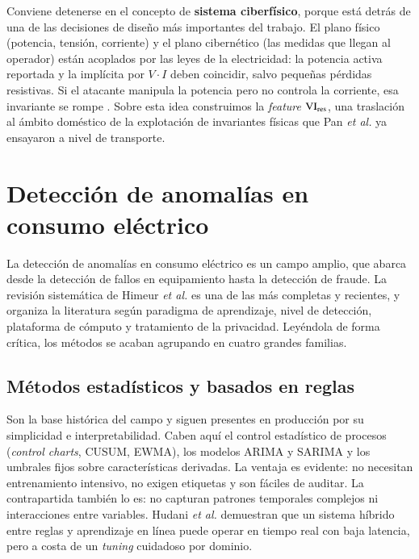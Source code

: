 Conviene detenerse en el concepto de \textbf{sistema ciberfísico}, porque está detrás de una de las decisiones de diseño más importantes del trabajo. El plano físico (potencia, tensión, corriente) y el plano cibernético (las medidas que llegan al operador) están acoplados por las leyes de la electricidad: la potencia activa reportada y la implícita por $V\cdot I$ deben coincidir, salvo pequeñas pérdidas resistivas. Si el atacante manipula la potencia pero no controla la corriente, esa invariante se rompe \cite{ahmad2025aif}. Sobre esta idea construimos la \textit{feature} $\mathrm{VI}_{\text{res}}$, una traslación al ámbito doméstico de la explotación de invariantes físicas que Pan \emph{et al.} \cite{pan2015fdi} ya ensayaron a nivel de transporte.

\section{Detección de anomalías en consumo eléctrico}
\label{sec:soa-ad}

La detección de anomalías en consumo eléctrico es un campo amplio, que abarca desde la detección de fallos en equipamiento hasta la detección de fraude. La revisión sistemática de Himeur \emph{et al.} \cite{himeur2021review} es una de las más completas y recientes, y organiza la literatura según paradigma de aprendizaje, nivel de detección, plataforma de cómputo y tratamiento de la privacidad. Leyéndola de forma crítica, los métodos se acaban agrupando en cuatro grandes familias.

\subsection{Métodos estadísticos y basados en reglas}

Son la base histórica del campo y siguen presentes en producción por su simplicidad e interpretabilidad. Caben aquí el control estadístico de procesos (\textit{control charts}, CUSUM, EWMA), los modelos ARIMA y SARIMA \cite{deboeck2007arima} y los umbrales fijos sobre características derivadas. La ventaja es evidente: no necesitan entrenamiento intensivo, no exigen etiquetas y son fáciles de auditar. La contrapartida también lo es: no capturan patrones temporales complejos ni interacciones entre variables. Hudani \emph{et al.} \cite{hudani2023realtime} demuestran que un sistema híbrido entre reglas y aprendizaje en línea puede operar en tiempo real con baja latencia, pero a costa de un \emph{tuning} cuidadoso por dominio.

